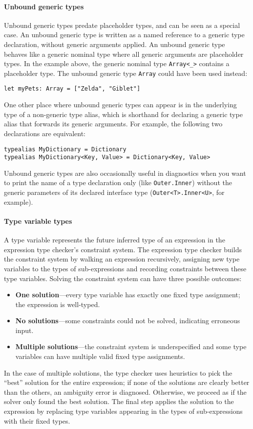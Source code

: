 \documentclass[a4paper,headsepline,bibliography=totoc,toc=flat,fleqn,twoside=semi]{scrbook}
\theoremstyle{definition}
\theoremstyle{definition}
\theoremstyle{definition}
\begin{document}
\paragraph{Unbound generic types}
Unbound generic types predate placeholder types, and can be seen as a special case. An unbound generic type is written as a named reference to a generic type declaration, without generic arguments applied. An unbound generic type behaves like a generic nominal type where all generic arguments are placeholder types. In the example above, the generic nominal type \texttt{Array<\_>} contains a placeholder type. The unbound generic type \texttt{Array} could have been used instead:
\begin{Verbatim}
let myPets: Array = ["Zelda", "Giblet"]
\end{Verbatim}
One other place where unbound generic types can appear is in the underlying type of a non-generic type alias, which is shorthand for declaring a generic type alias that forwards its generic arguments. For example, the following two declarations are equivalent:
\begin{Verbatim}
typealias MyDictionary = Dictionary
typealias MyDictionary<Key, Value> = Dictionary<Key, Value>
\end{Verbatim}
Unbound generic types are also occasionally useful in diagnostics when you want to print the name of a type declaration only (like \texttt{Outer.Inner}) without the generic parameters of its declared interface type (\texttt{Outer<T>.Inner<U>}, for example).

\paragraph{Type variable types}
A type variable represents the future inferred type of an expression in the expression type checker's constraint system. The expression type checker builds the constraint system by walking an expression recursively, assigning new type variables to the types of sub-expressions and recording constraints between these type variables. Solving the constraint system can have three possible outcomes:
\begin{itemize}
\item \textbf{One solution}---every type variable has exactly one fixed type assignment; the expression is well-typed.
\item \textbf{No solutions}---some constraints could not be solved, indicating erroneous input.
\item \textbf{Multiple solutions}---the constraint system is underspecified and some type variables can have multiple valid fixed type assignments.
\end{itemize}
In the case of multiple solutions, the type checker uses heuristics to pick the ``best'' solution for the entire expression; if none of the solutions are clearly better than the others, an ambiguity error is diagnosed. Otherwise, we proceed as if the solver only found the best solution. The final step applies the solution to the expression by replacing type variables appearing in the types of sub-expressions with their fixed types.
\end{document}
